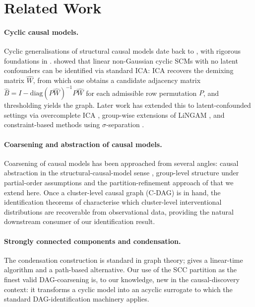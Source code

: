 \documentclass{article}
\begin{document}
\section{Related Work}
\label{sec:related}

\paragraph{Cyclic causal models.} Cyclic generalisations of structural causal models date back to \citet{spirtes1995directed}, with rigorous foundations in \citet{bongers2021foundations}. \citet{lacerda2008discovering} showed that linear non-Gaussian cyclic SCMs with no latent confounders can be identified via standard ICA: ICA recovers the demixing matrix $\hat W$, from which one obtains a candidate adjacency matrix $\hat B = I - \mathrm{diag}(P\hat W)^{-1} P\hat W$ for each admissible row permutation $P$, and thresholding yields the graph. Later work has extended this to latent-confounded settings via overcomplete ICA \citep{salehkaleybar2020learning, dai2026distributional}, group-wise extensions of LiNGAM \citep{maeda2020rcd}, and constraint-based methods using $\sigma$-separation \citep{forre2018constraint}.

\paragraph{Coarsening and abstraction of causal models.} Coarsening of causal models has been approached from several angles: causal abstraction in the structural-causal-model sense \citep{rubenstein2017causal,beckers2020approximate}, group-level structure under partial-order assumptions \citep{wahl2024foundations} and the partition-refinement approach of \citet{madaleno2026coarsening} that we extend here. Once a cluster-level causal graph (C-DAG) is in hand, the identification theorems of \citet{anand2023causal} characterise which cluster-level interventional distributions are recoverable from observational data, providing the natural downstream consumer of our identification result.

\paragraph{Strongly connected components and condensation.} The condensation construction is standard in graph theory; \citet{tarjan1972depth} gives a linear-time algorithm and \citet{gabow2000path} a path-based alternative. Our use of the SCC partition as the finest valid DAG-coarsening is, to our knowledge, new in the causal-discovery context: it transforms a cyclic model into an acyclic surrogate to which the standard DAG-identification machinery applies.
\end{document}
